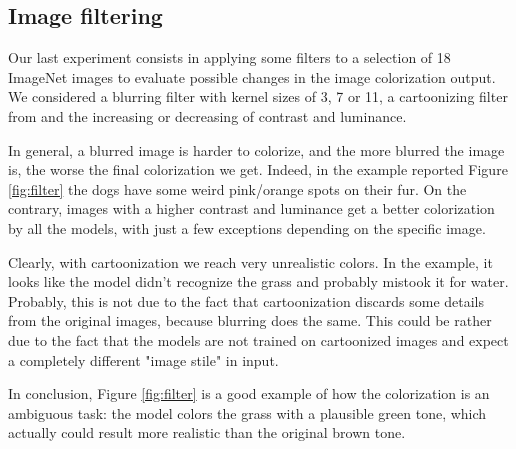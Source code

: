 \subsection{Image filtering}
\label{section:filtering}

Our last experiment consists in applying some filters to a selection of 18 ImageNet images to evaluate possible changes in the image colorization output. We considered a blurring filter with kernel sizes of 3, 7 or 11, a cartoonizing filter from \cite{cartoonize} and the increasing or decreasing of contrast and luminance.

In general, a blurred image is harder to colorize, and the more blurred the image is, the worse
the final colorization we get. Indeed, in the example reported Figure \ref{fig:filter} the dogs have some weird pink/orange
spots on their fur.
On the contrary, images with a higher contrast and luminance get a better colorization
by all the models, with just a few exceptions depending on the specific image.

Clearly, with cartoonization we reach very unrealistic colors. In the example, it looks like the model
didn't recognize the grass and probably mistook it for water. Probably, this is not due to the fact that cartoonization discards some details from the original images, because blurring does the same. This could be rather due to the fact that the models are not trained on cartoonized images and expect a completely different "image stile" in input. 

In conclusion, Figure \ref{fig:filter} is a good example of how the colorization is an ambiguous task: the model colors the grass with a plausible green tone, which actually could result more realistic than the original brown tone.

